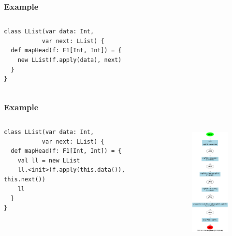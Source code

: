 \documentclass[hyperref={pdfpagelabels=false}]{beamer}
\begin{document}
\begin{frame}[fragile]
\frametitle{Example}
  \begin{columns}
    \begin{column}{0.4\textwidth}
\begin{lstlisting}[escapechar=\%]
class LList(var data: Int,
           var next: LList) {
  def mapHead(f: F1[Int, Int]) = {
    new LList(f.apply(data), next)
  }
}
\end{lstlisting}
    \end{column}
    \begin{column}{0.6\textwidth}
      \begin{figure}[t]
      \end{figure}
    \end{column}
  \end{columns}
\end{frame}
\begin{frame}[fragile]
\frametitle{Example}
  \begin{columns}
    \begin{column}{0.4\textwidth}
\begin{lstlisting}[escapechar=\%]
class LList(var data: Int,
           var next: LList) {
  def mapHead(f: F1[Int, Int]) = {
    val ll = new LList
    ll.<init>(f.apply(this.data()), this.next())
    ll
  }
}
\end{lstlisting}
    \end{column}
    \begin{column}{0.6\textwidth}
      \begin{figure}[t]
        \includegraphics[height=60mm]{images/e3.png}\\
      \end{figure}
    \end{column}
  \end{columns}
\end{frame}
\end{document}
